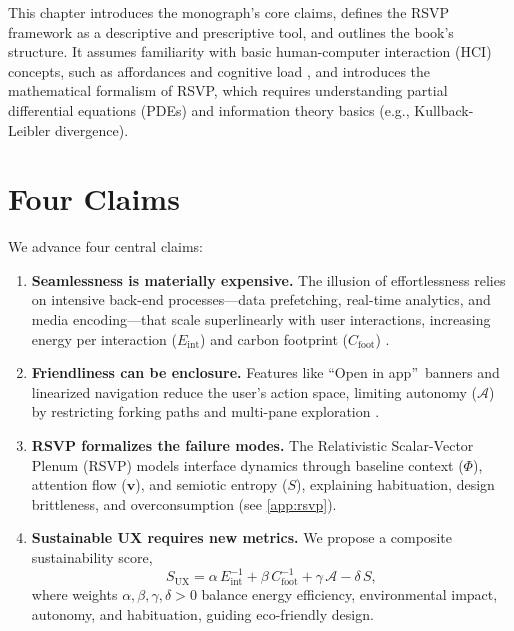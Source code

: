 \documentclass[openany]{book}
\newcommand{\PhiS}{\Phi} %
\newcommand{\vvec}{\mathbf{v}} %
\newcommand{\Sent}{S} %
\newcommand{\Eint}{E_{\mathrm{int}}} %
\newcommand{\Cfoot}{C_{\mathrm{foot}}} %
\newcommand{\Auton}{\mathcal{A}} %
\newcommand{\SUX}{S_{\mathrm{UX}}} %
\begin{document}
This chapter introduces the monograph’s core claims, defines the RSVP framework as a descriptive and prescriptive tool, and outlines the book’s structure. It assumes familiarity with basic human-computer interaction (HCI) concepts, such as affordances and cognitive load \citep{norman1988}, and introduces the mathematical formalism of RSVP, which requires understanding partial differential equations (PDEs) and information theory basics (e.g., Kullback-Leibler divergence).

\section{Four Claims}
\label{sec:intro-claims}
We advance four central claims:
\begin{enumerate}[label=\textbf{C\arabic*}.]
  \item \textbf{Seamlessness is materially expensive.} The illusion of effortlessness relies on intensive back-end processes---data prefetching, real-time analytics, and media encoding---that scale superlinearly with user interactions, increasing energy per interaction (\(\Eint\)) and carbon footprint (\(\Cfoot\)) \citep{extentia2024}.
  \item \textbf{Friendliness can be enclosure.} Features like \textquotedblleft Open in app\textquotedblright\ banners and linearized navigation reduce the user’s action space, limiting autonomy (\(\Auton\)) by restricting forking paths and multi-pane exploration \citep{doctorow2022}.
  \item \textbf{RSVP formalizes the failure modes.} The Relativistic Scalar-Vector Plenum (RSVP) models interface dynamics through baseline context (\(\PhiS\)), attention flow (\(\vvec\)), and semiotic entropy (\(\Sent\)), explaining habituation, design brittleness, and overconsumption (see \cref{app:rsvp}).
  \item \textbf{Sustainable UX requires new metrics.} We propose a composite sustainability score,
  \begin{equation}
  \label{eq:intro-SUX}
  \SUX = \alpha\,\Eint^{-1} + \beta\,\Cfoot^{-1} + \gamma\,\Auton - \delta\,\Sent,
  \end{equation}
  where weights \(\alpha, \beta, \gamma, \delta > 0\) balance energy efficiency, environmental impact, autonomy, and habituation, guiding eco-friendly design.
\end{enumerate}
\end{document}
